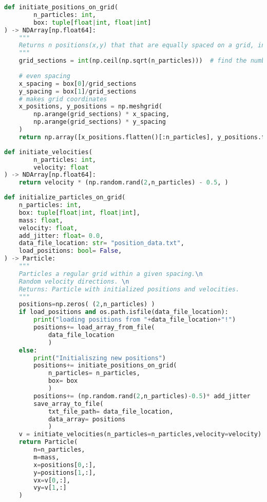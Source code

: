 \documentclass{article}
\begin{document}
\begin{lstlisting}[language=Python, caption=Slight changes to the initialization. This is the function that only return particle positions that lie on a grid.]
def initiate_positions_on_grid(
        n_particles: int,
        box: tuple[float|int, float|int]
) -> NDArray[np.float64]:
    """
    Returns n positions(x,y) that that are equally spaced on a grid, inside the box.
    """
    grid_sections = int(np.ceil(np.sqrt(n_particles)))  # find the number of colums & rows
    
    # even spacing
    x_spacing = box[0]/grid_sections 
    y_spacing = box[1]/grid_sections
    # makes grid coordinates
    x_positions, y_positions = np.meshgrid(
        np.arange(grid_sections) * x_spacing, 
        np.arange(grid_sections) * y_spacing
    )
    return np.array([x_positions.flatten()[:n_particles], y_positions.flatten()[:n_particles]])
\end{lstlisting}

\begin{lstlisting}[language=Python, caption=Slight changes to the initialization. This is the function that returns randomized velocity direction.]
def initiate_velocities(
        n_particles: int,
        velocity: float
) -> NDArray[np.float64]:
    return velocity * (np.random.rand(2,n_particles) - 0.5, ) 
\end{lstlisting}

\begin{lstlisting}[language=Python, caption=Slight changes to the initialization. This is how the newly implemented initialization function looks.] 
def initialize_particles_on_grid(
    n_particles: int, 
    box: tuple[float|int, float|int], 
    mass: float, 
    velocity: float,
    add_jitter: float= 0.0,
    data_file_location: str= "position_data.txt",
    load_positions: bool= False,
) -> Particle:
    """
    Particles a regular grid within a given spacing.\n
    Random velocity directions. \n
    Returns: Particle with initialized positions and velocities. 
    """
    positions=np.zeros( (2,n_particles) )
    if load_positions and os.path.isfile(data_file_location):
        print("loading positions from "+data_file_location+"!") 
        positions+= load_array_from_file(
            data_file_location
            )
    else:
        print("Initialiszing new positions")
        positions+= initiate_positions_on_grid(
            n_particles= n_particles,
            box= box
            )
        positions+= (np.random.rand(2,n_particles)-0.5)* add_jitter
        save_array_to_file(
            txt_file_path= data_file_location,
            data_array= positions
            )
    v = initiate_velocities(n_particles=n_particles,velocity=velocity) 
    return Particle(
        n=n_particles,
        m=mass,
        x=positions[0,:],
        y=positions[1,:],
        vx=v[0,:],
        vy=v[1,:]
    )
\end{lstlisting} \label{ll:initialize_particles_on_grid}
\end{document}
